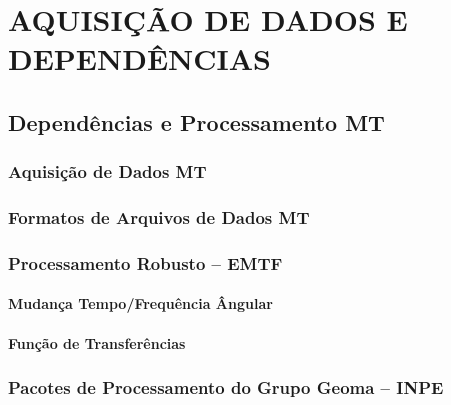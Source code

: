 \chapter{AQUISIÇÃO DE DADOS E DEPENDÊNCIAS}
    
    \section{Dependências e Processamento MT}
    
        \subsection{Aquisição de Dados MT}
        
        \subsection{Formatos de Arquivos de Dados MT}
        
        \subsection{Processamento Robusto -- EMTF}
            
            \subsubsection{Mudança Tempo/Frequência Ângular}
            
            \subsubsection{Função de Transferências}
           
        \subsection{Pacotes de Processamento do Grupo Geoma -- INPE}
    

    
